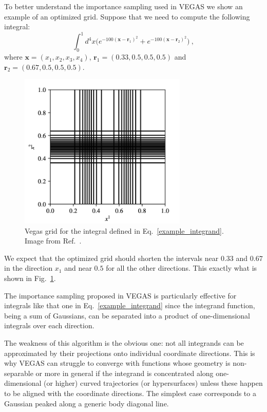 \documentclass[../main/main.tex]{subfiles}
\begin{document}
To better understand the importance sampling used in VEGAS we show an example of an optimized grid.
Suppose that we need to compute the following integral:
\begin{equation}
	\label{example_integrand}
	\int_0^1 d^4 x \big(e^{-100(\textbf{x}- \textbf{r}_1)^2} + e^{-100(\textbf{x}- \textbf{r}_2)^2} \big) \ ,
\end{equation}
where $\textbf{x} = (x_1, x_2, x_3, x_4)$, $\textbf{r}_1 = (0.33, 0.5, 0.5, 0.5)$ and $\textbf{r}_2 = (0.67, 0.5, 0.5, 0.5)$.
\begin{figure}
	\centering
	\includegraphics[width=8cm]{../images/vegas_grid.png}
	\caption{Vegas grid for the integral defined in Eq.~\ref{example_integrand}. Image from Ref.~\cite{Lepage:2020tgj}.}
	\label{vegas_grid}
\end{figure}
We expect that the optimized grid should shorten the intervals near $0.33$ and $0.67$ in the direction $x_1$ and near $0.5$ for all the 
other directions. This exactly what is shown in Fig.~\ref{vegas_grid}.

The importance sampling proposed in VEGAS is particularly effective for integrals like that one in Eq.~\ref{example_integrand} since the integrand function, being a sum of Gaussians, can be separated into a product of one-dimensional integrals over each direction.

The weakness of this algorithm is the obvious one: not all integrands can be approximated by their projections onto individual coordinate
directions. This is why VEGAS can struggle to converge with functions whose geometry is non-separable or more in general if the integrand
is concentrated along one-dimensional (or higher) curved trajectories (or hypersurfaces) unless these happen to be aligned with the coordinate directions. The simplest case corresponds to a Gaussian peaked along a generic body diagonal line.
\end{document}
